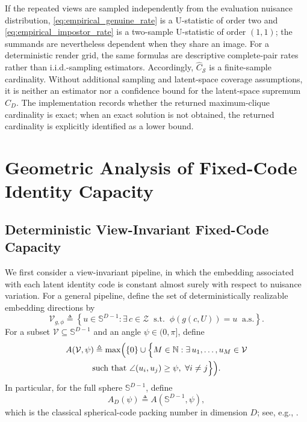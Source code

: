 \documentclass[journal]{IEEEtran}
\begin{document}
\begin{bibunit}
If the repeated views are sampled independently from the evaluation nuisance distribution, \eqref{eq:empirical_genuine_rate} is a U-statistic of order two and \eqref{eq:empirical_impostor_rate} is a two-sample U-statistic of order $(1,1)$; the summands are nevertheless dependent when they share an image. For a deterministic render grid, the same formulas are descriptive complete-pair rates rather than i.i.d.-sampling estimators. Accordingly, $\widehat C_{\mathcal S}$ is a finite-sample cardinality. Without additional sampling and latent-space coverage assumptions, it is neither an estimator nor a confidence bound for the latent-space supremum $C_D$. The implementation records whether the returned maximum-clique cardinality is exact; when an exact solution is not obtained, the returned cardinality is explicitly identified as a lower bound.
 






 

\section{Geometric Analysis of Fixed-Code Identity Capacity}
\label{sec:geometric_identity_capacity}

\subsection{Deterministic View-Invariant Fixed-Code Capacity}
\label{subsec:deterministic_capacity}


We first consider a view-invariant pipeline, in which the embedding associated with each latent identity code is constant almost surely with respect to nuisance variation. For a general pipeline, define the set of deterministically realizable embedding directions by
%
\begin{equation}
\!\!\!\!
\mathcal{V}_{g,\phi} \triangleq
\left\{ u\in\mathbb{S}^{D-1} : \exists\, c\in\mathcal{Z} \;\; \text{s.t.}\;\;
\phi(g(c,U))=u \;\; \text{a.s.} \right\}.
\label{eq:realizable_set_main}
\end{equation}
%
For a subset $\mathcal V\subseteq \mathbb S^{D-1}$ and an angle $\psi\in(0,\pi]$, define
%
\begin{multline}
A(\mathcal V,\psi) \triangleq \max\Bigl(\{0\}\cup\Bigl\{
M\in\mathbb N:\exists\, u_1,\ldots,u_M\in\mathcal V \\
\text{such that }
\angle(u_i,u_j)\ge \psi,\ \forall i\neq j \Bigr\}\Bigr).
\label{eq:restricted_spherical_code_main}
\end{multline}
%
In particular, for the full sphere $\mathbb S^{D-1}$, define
%
\begin{equation}
A_D(\psi)\triangleq A(\mathbb S^{D-1},\psi),
\label{eq:spherical_code_def_main}
\end{equation}
%
which is the classical spherical-code packing number in dimension $D$; see, e.g., \cite{rankin1955closest, conway2013sphere}.



\end{bibunit}
\end{document}
